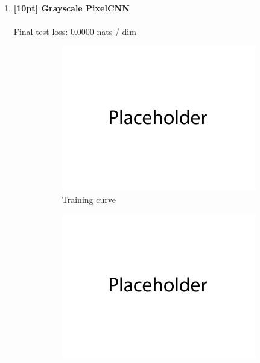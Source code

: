 \documentclass{article}
\begin{document}
\begin{enumerate}
\newpage
\item {\bf [10pt] Grayscale PixelCNN} \\\\
Final test loss: 0.0000  nats / dim
\begin{figure}[H]
    \centering
    \begin{subfigure}{0.45\textwidth}
        \centering
        \includegraphics[width=\textwidth]{figures/q4_c_train_plot.png}
        \caption{Training curve}
    \end{subfigure}
    \hspace{0.2in}
    \begin{subfigure}{0.45\textwidth}
        \centering
        \includegraphics[width=\textwidth]{figures/q4_c_samples.png}

\end{subfigure}
\end{figure}
\end{enumerate}
\end{document}

